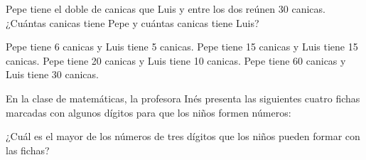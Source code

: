 \documentclass[10pt,letterpaper,addpoints]{exam}
\begin{document}
\begin{multicols}{2}
\begin{questions}
\question Pepe tiene el doble de canicas que Luis y entre los dos reúnen 30 canicas. ¿Cuántas canicas tiene Pepe y cuántas canicas tiene Luis?
\begin{choices}
\choice Pepe tiene 6 canicas y Luis tiene 5 canicas.
\choice Pepe tiene 15 canicas y Luis tiene 15 canicas.
\CorrectChoice Pepe tiene 20 canicas y Luis tiene 10 canicas.
\choice Pepe tiene 60 canicas y Luis tiene 30 canicas.
\end{choices}
\question En la clase de matemáticas, la profesora Inés presenta las siguientes cuatro fichas marcadas con algunos dígitos para que los niños formen números:
\begin{center}
\end{center}
¿Cuál es el mayor de los números de tres dígitos que los niños pueden formar con las fichas?
\begin{multicols}{2}
\begin{choices}
\end{choices}
\end{multicols}
\end{questions}
\end{multicols}
\end{document}
